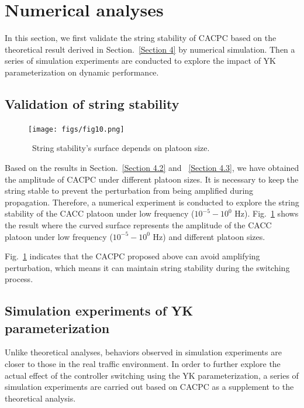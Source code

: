 \documentclass[trsc,nonblindrev]{informs3} %
\begin{document}
\section{Numerical analyses}
\label{Section 5}

In this section, we first validate the string stability of CACPC based on the theoretical result derived in Section.~\ref{Section 4} by numerical simulation. Then a series of simulation experiments are conducted to explore the impact of YK parameterization on dynamic performance.

\subsection{Validation of string stability}
\label{Section 5.1}

\begin{figure}
    \centering
    \texttt{[image: figs/fig10.png]}
    \caption{~String stability's surface depends on platoon size.}
    \label{fig10}
\end{figure}

Based on the results in Section.~\ref{Section 4.2} and ~\ref{Section 4.3}, we have obtained the amplitude of CACPC under different platoon sizes. It is necessary to keep the string stable to prevent the perturbation from being amplified during propagation. Therefore, a numerical experiment is conducted to explore the string stability of the CACC platoon under low frequency ($10^{-5} - 10^0$ Hz). Fig.~\ref{fig10} shows the result where the curved surface represents the amplitude of the CACC platoon under low frequency ($10^{-5} - 10^0$ Hz) and different platoon sizes.

Fig.~\ref{fig10} indicates that the CACPC proposed above can avoid amplifying perturbation, which means it can maintain string stability during the switching process.

\subsection{Simulation experiments of YK parameterization}
\label{Section 5.2}

Unlike theoretical analyses, behaviors observed in simulation experiments are closer to those in the real traffic environment. In order to further explore the actual effect of the controller switching using the YK parameterization, a series of simulation experiments are carried out based on CACPC as a supplement to the theoretical analysis.
\end{document}
